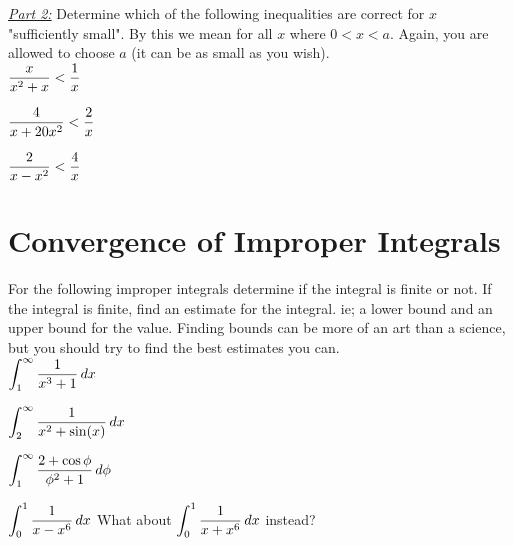 \documentclass{article}
\begin{document}
\underline{\emph{Part 2:}} Determine which of the following inequalities are correct for $x$ "sufficiently small".  By this we mean for all $x$ where $0 < x < a$.  Again, you are allowed to choose $a$ (it can be as small as you wish).\\

\prob $\displaystyle \frac{x}{x^2 + x} < \frac{1}{x}$\vfill

\prob $\displaystyle \frac{4}{x + 20x^2} < \frac{2}{x}$\vfill

\prob $\displaystyle \frac{2}{x - x^2} < \frac{4}{x}$\vfill

\newpage

\section*{Convergence of Improper Integrals}

For the following improper integrals determine if the integral is finite or not.  If the integral is finite, find an estimate for the integral.  ie; a lower bound and an upper bound for the value.  Finding bounds can be more of an art than a science, but you should try to find the best estimates you can.\\

\prob $\displaystyle \int_1^{\infty} \frac{1}{x^3 + 1}\,dx$\vfill

\prob $\displaystyle \int_{2}^{\infty} \frac{1}{x^2 + \sin(x)}\,dx$\vfill

\newpage

\prob $\displaystyle \int_1^{\infty} \frac{2 + \cos \phi}{\phi^2 + 1}\,d\phi$\vfill

\prob $\displaystyle \int_0^1 \frac{1}{x - x^6}\,dx$ \qquad\quad What about $\displaystyle\int_0^1 \frac{1}{x + x^6}\,dx$ instead?\vfill
\end{document}
